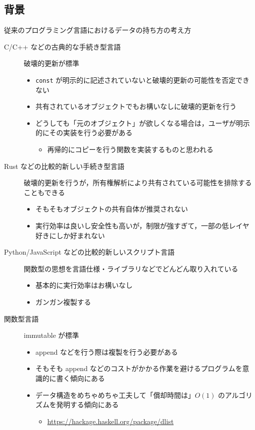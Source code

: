 \documentclass[10pt, a4j, twocolumn]{scrartcl}
\begin{document}
\subsection{背景}
\label{sec:org45ed058}

従来のプログラミング言語におけるデータの持ち方の考え方
\begin{description}
\item[{C/C++ などの古典的な手続き型言語}] 破壊的更新が標準
\begin{itemize}
\item \texttt{const} が明示的に記述されていないと破壊的更新の可能性を否定できない
\item 共有されているオブジェクトでもお構いなしに破壊的更新を行う
\item どうしても「元のオブジェクト」が欲しくなる場合は，ユーザが明示的にその実装を行う必要がある
\begin{itemize}
\item 再帰的にコピーを行う関数を実装するものと思われる
\end{itemize}
\end{itemize}
\item[{Rust などの比較的新しい手続き型言語}] 破壊的更新を行うが，所有権解析により共有されている可能性を排除することもできる
\begin{itemize}
\item そもそもオブジェクトの共有自体が推奨されない
\item 実行効率は良いし安全性も高いが，制限が強すぎて，一部の低レイヤ好きにしか好まれない
\end{itemize}
\item[{Python/JavaScript などの比較的新しいスクリプト言語}] 関数型の思想を言語仕様・ライブラリなどでどんどん取り入れている
\begin{itemize}
\item 基本的に実行効率はお構いなし
\item ガンガン複製する
\end{itemize}
\item[{関数型言語}] immutable が標準
\begin{itemize}
\item append などを行う際は複製を行う必要がある
\item そもそも append などのコストがかかる作業を避けるプログラムを意識的に書く傾向にある
\item データ構造をめちゃめちゃ工夫して「償却時間は」\(O(1)\) のアルゴリズムを発明する傾向にある
\begin{itemize}
\item \url{https://hackage.haskell.org/package/dlist}

\end{itemize}
\end{itemize}
\end{description}
\end{document}
